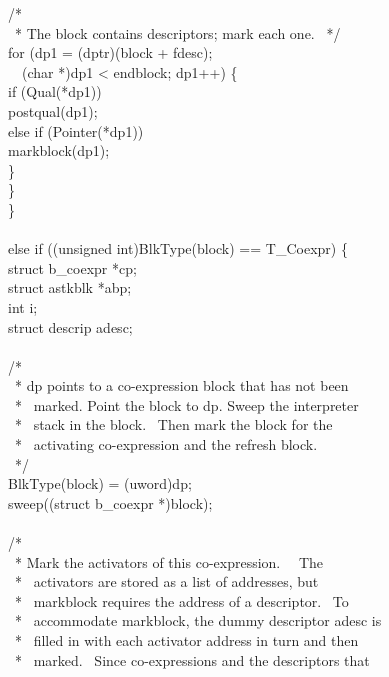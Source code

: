 {\>\>\>\>/*\\
\>\>\>\>\ * The block contains descriptors; mark each one. 
\>\>\>\>\ */\\
\>\>\>\>for (dp1 = (dptr)(block + fdesc);\\
\>\>\>\>\>\ \ (char *)dp1 < endblock; dp1++) \{\\
\>\>\>\>\>if (Qual(*dp1))\\
\>\>\>\>\>\>postqual(dp1);\\
\>\>\>\>\>else if (Pointer(*dp1))\\
\>\>\>\>\>\>markblock(dp1);\\
\>\>\>\>\>\}\\
\>\>\>\}\\
\>\>\}\\
\\
\>else if ((unsigned int)BlkType(block) == T\_Coexpr) \{\\
\>\>struct b\_coexpr *cp;\\
\>\>struct astkblk *abp;\\
\>\>int i;\\
\>\>struct descrip adesc;\\
\\
\>\>/*\\
\>\>\ * dp points to a co-expression block that has not been\\
\>\>\ * \ marked. Point the block to dp. Sweep the interpreter\\
\>\>\ * \ stack in the block. \ Then mark the block for the\\
\>\>\ * \ activating co-expression and the refresh block.\\
\>\>\ */\\
\>\>BlkType(block) = (uword)dp;\\
\>\>sweep((struct b\_coexpr *)block);\\
\\
\>\>/*\\
\>\>\ * Mark the activators of this co-expression. \ \ The\\
\>\>\ * \ activators are stored as a list of addresses, but\\
\>\>\ * \ markblock requires the address of a descriptor. \ To\\
\>\>\ * \ accommodate markblock, the dummy descriptor adesc is\\
\>\>\ * \ filled in with each activator address in turn and then\\
\>\>\ * \ marked. \ Since co-expressions and the descriptors that\\
}
